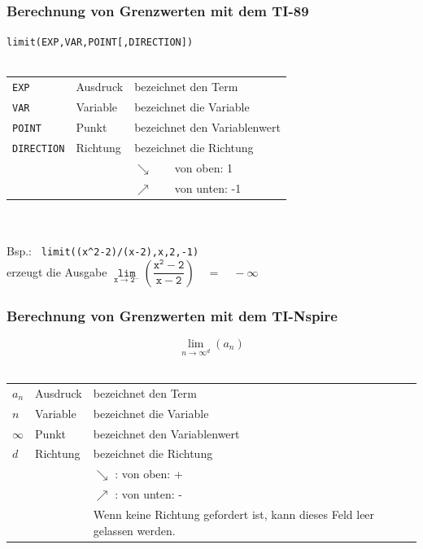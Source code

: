 \subsubsection{Berechnung von Grenzwerten mit dem TI-89}\label{subsubsec:limti}
\verb?limit(EXP,VAR,POINT[,DIRECTION])?\\\\
\begin{tabular}{@{}lll}
\verb|EXP|	& Ausdruck	& bezeichnet den Term \\
\verb|VAR|	& Variable	& bezeichnet die Variable \\
\verb|POINT|	& Punkt		& bezeichnet den Variablenwert \\
\verb|DIRECTION|& Richtung 	& bezeichnet die Richtung \\
		&		& $\searrow$~~~~von oben: 1 \\
		&		& $\nearrow$~~~~von unten: -1 \\
\end{tabular}\\\\
Bsp.: \verb| limit((x^2-2)/(x-2),x,2,-1)| \\
\indent\indent erzeugt die Ausgabe $\mathtt{ \lim\limits_{x \rightarrow 2^-} (\dfrac{x^2-2}{x-2}) \quad = \quad - \infty } $
\fi
\ifnspire
\subsubsection{Berechnung von Grenzwerten mit dem TI-Nspire}\label{subsubsec:limnspire}
\[ \lim\limits_{\boxed{n}\to\boxed{\infty}^{\boxed{d}}}(\boxed{a_n}) \]\\
\begin{tabular}{@{}llp{6cm}}
$\boxed{a_n}$    & Ausdruck & bezeichnet den Term \\
$\boxed{n}$      & Variable & bezeichnet die Variable \\
$\boxed{\infty}$ & Punkt    & bezeichnet den Variablenwert \\
$\boxed{d}$      & Richtung & bezeichnet die Richtung \\
                 &          & $\searrow$ : von oben: + \\
                 &          & $\nearrow$ : von unten: - \\
		 &          & Wenn keine Richtung gefordert ist, kann dieses Feld leer gelassen werden. 
\end{tabular}
\fi

